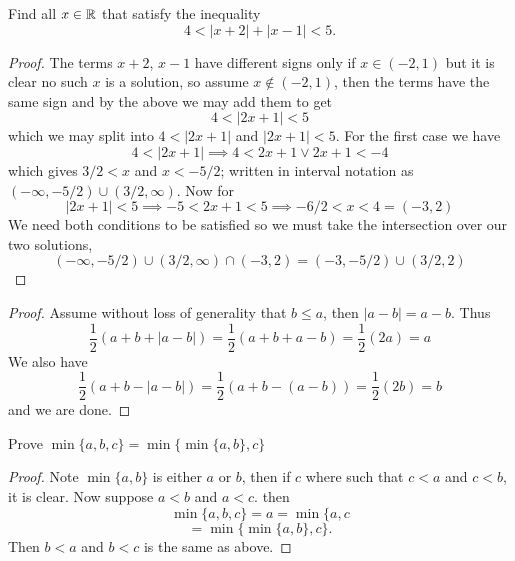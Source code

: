\question 
Find all $x \in \mathbb{R}$ that satisfy the inequality 
\[ 4 < |x + 2| + |x - 1| < 5. \] 


\begin{proof}
    The terms $x + 2$, $x - 1$ have different signs only if $x \in (-2, 1)$ but it is clear 
    no such $x$ is a solution, so assume $x \notin (-2, 1)$, then the terms have the same sign and by the above we may add them 
    to get 
    \[4 < |2x +1 | < 5\]
    which we may split into $4 < |2x + 1| $ and $|2x + 1| < 5$. 
    For the first case we have 
    \[4 < |2x + 1| \implies 4 < 2x + 1 \vee 2x + 1 < -4\]
    which gives $3/2 < x$ and $x < -5/2$; written in interval notation as $(-\infty, -5/2) \cup (3/2, \infty)$. 
    Now for 
    \[|2x + 1| < 5 \implies -5 < 2x + 1 < 5 \implies -6/2 < x < 4 = (-3, 2)\]
    We need both conditions to be satisfied so we must take the intersection over our two solutions, 
    \[(-\infty, -5/2) \cup (3/2, \infty) \cap (-3, 2) = (-3, -5/2) \cup (3/2, 2)\]
\end{proof}

\question  
\begin{alphaparts}
\questionpart

\begin{proof}
    Assume without loss of generality that $b \leq a$, then $|a - b| = a - b$. 
    Thus 
    \[\frac{1}{2}(a + b + |a - b|) = \frac{1}{2}(a + b + a -b ) = \frac{1}{2}(2a) = a\]
    We also have 
    \[\frac{1}{2}(a + b - |a - b|) = \frac{1}{2}(a + b -(a - b)) = \frac{1}{2}(2b) = b\]
    and we are done.  
\end{proof}

\questionpart 
Prove $\min\{a, b, c\} = \min\{\min\{a, b\}, c\}$

\begin{proof}
    Note $\min\{a, b\}$ is either $a$ or $b$, then if $c$ where such that $c < a$ and $c < b$, it is clear. Now suppose $a < b$ and $a < c$. then 
\[ \min\{a, b, c\} = a = \min\{a, c \] 
\[ = \min\{\min\{a, b\}, c\}.\]
Then $b < a$ and $b < c$ is the same as above.

\end{proof}


\end{alphaparts}


\question 


